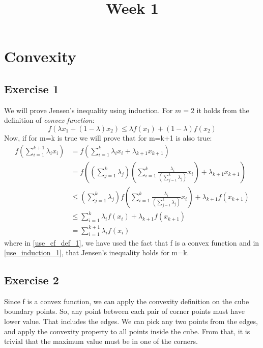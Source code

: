 \documentclass[twoside,11pt]{article}
\begin{document}
	
\title{Week 1}
\date{\vspace{-5ex}}
\maketitle

\section{Convexity}

\subsection{Exercise 1}

We will prove Jensen's inequality using induction.
For $m=2$ it holds from the definition of \emph{convex function}:
\begin{equation}
f(\lambda x_1 + (1 - \lambda) x_2) \leq \lambda f(x_1) + (1 - \lambda) f(x_2)
\end{equation}
Now, if for m=k is true we will prove that for m=k+1 is also true:
\begin{align}
	f\left(\sum_{i=1}^{k+1} \lambda_{i} x_{i}\right) & = f\left(\sum_{i=1}^{k} \lambda_{i} x_{i} + \lambda_{k+1}x_{k+1}\right) \\
	& = f\left(\left(\sum_{j=1}^{k} \lambda_j \right) \left(\sum_{i=1}^{k} \frac{\lambda_{i}}{\left(\sum_{j=1}^{k} \lambda_j \right)} x_{i} \right) + \lambda_{k+1}x_{k+1}\right) \\
	& \leq \left(\sum_{j=1}^{k} \lambda_j \right) f\left(\sum_{i=1}^{k} \frac{\lambda_{i}}{\left(\sum_{j=1}^{k} \lambda_j \right)} x_{i} \right) + \lambda_{k+1}f(x_{k+1}) \label{use_cf_def_1} \\ 
	& \leq \sum_{i=1}^{k} \lambda_{i} f(x_{i}) + \lambda_{k+1}f(x_{k+1}) \label{use_induction_1} \\ 
	& = \sum_{i=1}^{k+1} \lambda_{i} f(x_{i})
\end{align}
where in \eqref{use_cf_def_1}, we have used the fact that f is a convex function and in \eqref{use_induction_1}, that Jensen's inequality holds for m=k.

\subsection{Exercise 2}

Since f is a convex function, we can apply the convexity definition on the cube boundary points. So, any point between each pair of corner points must have lower value. That includes the edges. We can pick any two points from the edges, and apply the convexity property to all points inside the cube. From that, it is trivial that the maximum value must be in one of the corners.
\end{document}
